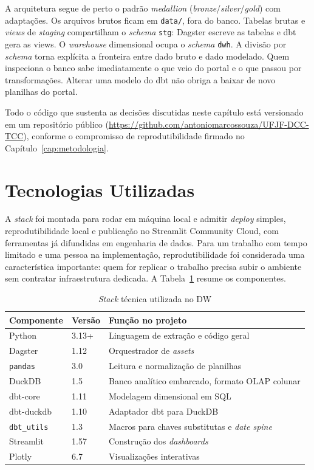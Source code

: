 A arquitetura segue de perto o padrão \textit{medallion} (\textit{bronze}/\textit{silver}/\textit{gold}) com adaptações. Os arquivos brutos ficam em \texttt{data/}, fora do banco. Tabelas brutas e \textit{views} de \textit{staging} compartilham o \textit{schema} \texttt{stg}: Dagster escreve as tabelas e dbt gera as views. O \textit{warehouse} dimensional ocupa o \textit{schema} \texttt{dwh}. A divisão por \textit{schema} torna explícita a fronteira entre dado bruto e dado modelado. Quem inspeciona o banco sabe imediatamente o que veio do portal e o que passou por transformações. Alterar uma modelo do dbt não obriga a baixar de novo planilhas do portal.

Todo o código que sustenta as decisões discutidas neste capítulo está versionado em um repositório público (\url{https://github.com/antoniomarcossouza/UFJF-DCC-TCC}), conforme o compromisso de reprodutibilidade firmado no Capítulo~\ref{cap:metodologia}.

\section{Tecnologias Utilizadas}

A \textit{stack} foi montada para rodar em máquina local e admitir \textit{deploy} simples, reprodutibilidade local e publicação no Streamlit Community Cloud, com ferramentas já difundidas em engenharia de dados. Para um trabalho com tempo limitado e uma pessoa na implementação, reprodutibilidade foi considerada uma característica importante: quem for replicar o trabalho precisa subir o ambiente sem contratar infraestrutura dedicada. A Tabela~\ref{tab:stack} resume os componentes.

\begin{table}[htb]
\caption{\textit{Stack} técnica utilizada no DW}
\label{tab:stack}
\centering
\small
\begin{tabular}{p{3.0cm} p{2.0cm} p{8.0cm}}
\hline
\textbf{Componente} & \textbf{Versão} & \textbf{Função no projeto} \\
\hline
Python & 3.13+ & Linguagem de extração e código geral \\
Dagster & 1.12 & Orquestrador de \textit{assets} \\
\texttt{pandas} & 3.0 & Leitura e normalização de planilhas \\
DuckDB & 1.5 & Banco analítico embarcado, formato OLAP colunar \\
dbt-core & 1.11 & Modelagem dimensional em SQL \\
dbt-duckdb & 1.10 & Adaptador dbt para DuckDB \\
\texttt{dbt\_utils} & 1.3 & Macros para chaves substitutas e \textit{date spine} \\
Streamlit & 1.57 & Construção dos \textit{dashboards} \\
Plotly & 6.7 & Visualizações interativas \\
\hline
\end{tabular}
\end{table}

